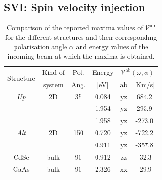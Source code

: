 \documentclass[prb,11pt,tightenlines,twocolumn,aps]{revtex4-1}
\begin{document}

\subsection{SVI: Spin velocity injection} %
\label{sec:res-spin_velocity}

\begin{table}[b]
\begin{tabular}{cccccc}
\hline
\multirow{2}{*}{Structure \quad} & 
Kind of \quad & 
Pol. &
Energy & 
\multicolumn{2}{c}{$\mathcal{V}^{\mathrm{ab}}(\omega,\alpha)$}\\
\cline{5-6}
& system & Ang. & [eV] & $\mathrm{ab}$ \quad & [Km/s]\\
\hline
\emph{Up}    & 2D   & 35    & 0.084  & $\mathrm{yz}$ &  684.2    \\
             &      &       & 1.954  & $\mathrm{yz}$ &  293.9    \\
             &      &       & 1.958  & $\mathrm{yz}$ & -273.0    \\
\emph{Alt}   & 2D   & 150   & 0.720  & $\mathrm{yz}$ & -722.2    \\
             &      &       & 0.911  & $\mathrm{yz}$ & -357.8    \\
 CdSe        & bulk & 90    & 0.912  & $\mathrm{zz}$ &  -32.3    \\
 GaAs        & bulk & 90    & 2.326  & $\mathrm{xx}$ &  -29.9    \\
\hline
\end{tabular}

\caption{Comparison of the reported maxima values of
$\mathcal{V}^{\mathrm{ab}}$ for the different structures and their
corresponding polarization angle $\alpha$ and energy values of the incoming
beam at which the maxima is obtained.}
\label{tab:vab-str-comp}
\end{table}
\end{document}
